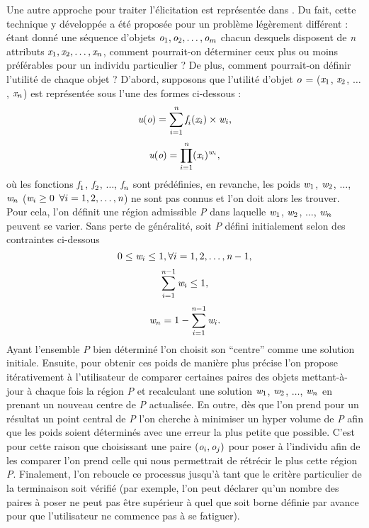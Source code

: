 \documentclass[a4paper,11pt]{article}
\theoremstyle{plain}
\begin{document}
Une autre approche pour traiter l’élicitation est représentée dans \cite{iyengar_q-eval_2001}. Du fait, cette technique y développée a été proposée pour un problème légèrement différent : étant donné une séquence d’objets $\emph{o}_1, \emph{o}_2, \dotsc, \emph{o}_m$ chacun desquels disposent de \emph{n} attributs $\emph{x}_1, \emph{x}_2, \dotsc, \emph{x}_n$, comment pourrait-on déterminer ceux plus ou moins préférables pour un individu particulier ? De plus, comment pourrait-on définir l’utilité de chaque objet ? D’abord, supposons que l’utilité d’objet $\emph{o}$ = ($\emph{x}_1$, $\emph{x}_2$, $\dotsc$, $\emph{x}_n$) est représentée sous l’une des formes ci-dessous :
\[\emph{u}(\emph{o}) = \sum_{i = 1}^{\emph{n}} \emph{f}_i(\emph{x}_i) \times \emph{w}_i ,\]
\[\emph{u}(\emph{o}) = \prod_{i = 1}^{\emph{n}} (\emph{x}_i) ^ {\emph{w}_i} ,\]
où les fonctions $\emph{f}_1$, $\emph{f}_2$, $\dotsc$, $\emph{f}_n$ sont prédéfinies, en revanche, les poids $\emph{w}_1$, $\emph{w}_2$, $\dotsc$, $\emph{w}_ n$ ($\emph{w}_i \geq 0 $ $ \forall i = 1, 2, \dotsc, \emph{n}$) ne sont pas connus et l’on doit alors les trouver. Pour cela, l’on définit une région admissible \emph{P} dans laquelle $\emph{w}_1$, $\emph{w}_2$, $\dotsc$, $\emph{w}_ n$ peuvent se varier. Sans perte de généralité, soit \emph{P} défini initialement selon des contraintes ci-dessous
\[0 \leq \emph{w}_i \leq 1,  \forall i = 1, 2, \dotsc, \emph{n}-1, \]
\[\sum_{i = 1}^{\emph{n} - 1}\emph{w}_i \leq 1,\]
\[\emph{w}_n = 1 - \sum_{i = 1}^{\emph{n} - 1}\emph{w}_i. \]
Ayant l’ensemble \emph{P} bien déterminé l’on choisit son ``centre'' comme une solution initiale. Ensuite, pour obtenir ces poids de manière plus précise l’on propose itérativement à l’utilisateur de comparer certaines paires des objets mettant-à-jour à chaque fois la région \emph{P} et recalculant une solution $\emph{w}_1$, $\emph{w}_2$, $\dotsc$, $\emph{w}_ n$ en prenant un nouveau centre de \emph{P} actualisée. En outre, dès que l’on prend pour un résultat un point central de \emph{P} l’on cherche à minimiser un hyper volume de \emph{P} afin que les poids soient déterminés avec une erreur la plus petite que possible. C’est pour cette raison que choisissant une paire $(\emph{o}_i, \emph{o}_j)$ pour poser à l’individu afin de les comparer l’on prend celle qui nous permettrait de rétrécir le plus cette région \emph{P}. Finalement, l’on reboucle ce processus jusqu’à tant que le critère particulier de la terminaison soit vérifié (par exemple, l’on peut déclarer qu’un nombre des paires à poser ne peut pas être supérieur à quel que soit borne définie par avance pour que l’utilisateur ne commence pas à se fatiguer).
\end{document}
